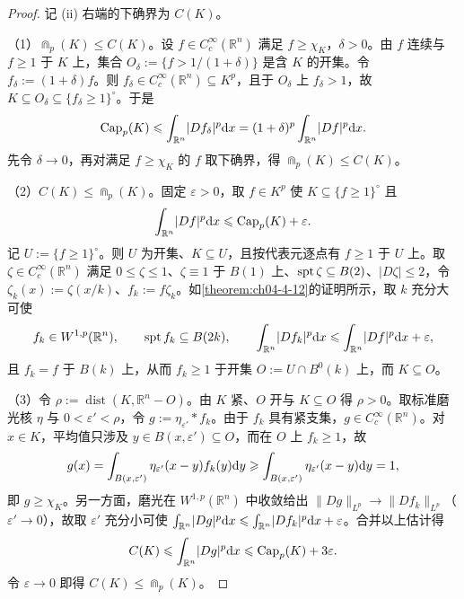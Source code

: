 \documentclass[../../main.tex]{subfiles}%
\begin{document}
\begin{proof}
记 (ii) 右端的下确界为 $C(K)$。

（1）$\Cap_p(K)\leqslant C(K)$。设 $f\in C_c^{\infty}(\mathbb{R}^n)$ 满足 $f\geqslant\chi_K$，$\delta>0$。由 $f$ 连续与 $f\geqslant1$ 于 $K$ 上，集合 $O_\delta:=\{f>1/(1+\delta)\}$ 是含 $K$ 的开集。令 $f_\delta:=(1+\delta)f$。则 $f_\delta\in C_c^{\infty}(\mathbb{R}^n)\subseteq K^p$，且于 $O_\delta$ 上 $f_\delta>1$，故 $K\subseteq O_\delta\subseteq\{f_\delta\geqslant1\}^{\circ}$。于是
\begin{align*}
\operatorname{Cap}_p(K)\leqslant\int_{\mathbb{R}^n}\lvert Df_\delta\rvert^p\mathrm{d} x=(1+\delta)^p\int_{\mathbb{R}^n}\lvert Df\rvert^p\mathrm{d} x .
\end{align*}
先令 $\delta\to0$，再对满足 $f\geqslant\chi_K$ 的 $f$ 取下确界，得 $\Cap_p(K)\leqslant C(K)$。

（2）$C(K)\leqslant\Cap_p(K)$。固定 $\varepsilon>0$，取 $f\in K^p$ 使 $K\subseteq\{f\geqslant1\}^{\circ}$ 且
\begin{align*}
\int_{\mathbb{R}^n}\lvert Df\rvert^p\mathrm{d} x\leqslant\operatorname{Cap}_p(K)+\varepsilon .
\end{align*}
记 $U:=\{f\geqslant1\}^{\circ}$。则 $U$ 为开集、$K\subseteq U$，且按代表元逐点有 $f\geqslant1$ 于 $U$ 上。取 $\zeta\in C_c^{\infty}(\mathbb{R}^n)$ 满足 $0\leqslant\zeta\leqslant1$、$\zeta\equiv1$ 于 $B(1)$ 上、$\operatorname{spt}\zeta\subseteq B(2)$、$\lvert D\zeta\rvert\leqslant2$，令 $\zeta_k(x):=\zeta(x/k)$、$f_k:=f\zeta_k$。如\cref{theorem:ch04-4-12}的证明所示，取 $k$ 充分大可使%
\begin{align*}
f_k\in W^{1,p}(\mathbb{R}^n),\qquad \operatorname{spt} f_k\subseteq B(2k),\qquad \int_{\mathbb{R}^n}\lvert Df_k\rvert^p\mathrm{d} x\leqslant\int_{\mathbb{R}^n}\lvert Df\rvert^p\mathrm{d} x+\varepsilon ,
\end{align*}
且 $f_k=f$ 于 $B(k)$ 上，从而 $f_k\geqslant1$ 于开集 $O:=U\cap B^{0}(k)$ 上，而 $K\subseteq O$。

（3）令 $\rho:=\operatorname{dist}(K,\mathbb{R}^n-O)$。由 $K$ 紧、$O$ 开与 $K\subseteq O$ 得 $\rho>0$。取标准磨光核 $\eta$ 与 $0<\varepsilon'<\rho$，令 $g:=\eta_{\varepsilon'}*f_k$。由于 $f_k$ 具有紧支集，$g\in C_c^{\infty}(\mathbb{R}^n)$。对 $x\in K$，平均值只涉及 $y\in B(x,\varepsilon')\subseteq O$，而在 $O$ 上 $f_k\geqslant1$，故
\begin{align*}
g(x)=\int_{B(x,\varepsilon')}\eta_{\varepsilon'}(x-y)f_k(y)\mathrm{d} y\geqslant\int_{B(x,\varepsilon')}\eta_{\varepsilon'}(x-y)\mathrm{d} y=1 ,
\end{align*}
即 $g\geqslant\chi_K$。另一方面，磨光在 $W^{1,p}(\mathbb{R}^n)$ 中收敛给出 $\lVert Dg\rVert_{L^p}\to\lVert Df_k\rVert_{L^p}$（$\varepsilon'\to0$），故取 $\varepsilon'$ 充分小可使 $\int_{\mathbb{R}^n}\lvert Dg\rvert^p\mathrm{d} x\leqslant\int_{\mathbb{R}^n}\lvert Df_k\rvert^p\mathrm{d} x+\varepsilon$。合并以上估计得
\begin{align*}
C(K)\leqslant\int_{\mathbb{R}^n}\lvert Dg\rvert^p\mathrm{d} x\leqslant\operatorname{Cap}_p(K)+3\varepsilon .
\end{align*}
令 $\varepsilon\to0$ 即得 $C(K)\leqslant\Cap_p(K)$。
\end{proof}
\end{document}
